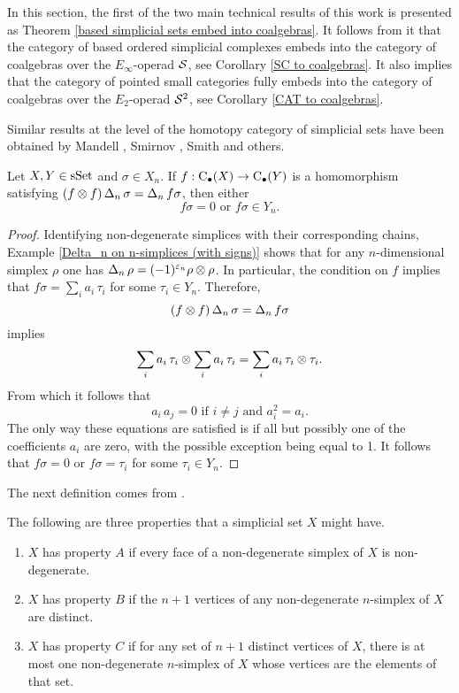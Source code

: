 \documentclass[main.tex]{subfiles}
\begin{document}
In this section, the first of the two main technical results of this work is presented as Theorem \ref{based simplicial sets embed into coalgebras}. It follows from it that the category of based ordered simplicial complexes embeds into the category of coalgebras over the $E_\infty$-operad $\S$, see Corollary \ref{SC to coalgebras}. It also implies that the category of pointed small categories fully embeds into the category of coalgebras over the $E_2$-operad $\S^2$, see Corollary \ref{CAT to coalgebras}.

Similar results at the level of the homotopy category of simplicial sets have been obtained by Mandell \cite{Man06}, Smirnov \cite{Smi98}, Smith \cite{Smi15} and others.

\begin{lemma} \label{simplices to simplices}
Let $X,Y\in\sSet$ and $\sigma\in X_n$. If $f:\chains(X)\to\chains(Y)$ is a homomorphism satisfying $(f\tensor f)\cop_n\sigma=\cop_n f\sigma$, then either $$f\sigma=0\text{\ \ or\ \ }f\sigma\in Y_n.$$
\begin{proof}
Identifying non-degenerate simplices with their corresponding chains, Example \ref{Delta_n on n-simplices (with signs)} shows that for any $n$-dimensional simplex $\rho$ one has $\cop_n\rho=(-1)^{\varepsilon_n}\rho\tensor\rho$. In particular, the condition on $f$ implies that $f\sigma=\sum_ia_i\,\tau_i$ for some $\tau_i\in Y_n$. Therefore,
$$(f\tensor f)\cop_n\sigma=\cop_n f\sigma$$ implies $$\sum_ia_i\,\tau_i\tensor \sum_ia_i\,\tau_i = \sum_ia_i\,\tau_i\tensor\tau_i. $$
From which it follows that
$$a_i\,a_j=0 \text{ if } i\neq j \text{ and } a_i^2=a_i.$$
The only way these equations are satisfied is if all but possibly one of the coefficients $a_i$ are zero, with the possible exception being equal to 1. It follows that $f\sigma=0$ or $f\sigma=\tau_i$ for some $\tau_i\in Y_n$.
\end{proof}
\end{lemma}

The next definition comes from \cite{May03}.

\begin{defn} The following are three properties that a simplicial set $X$ might have.
\begin{enumerate}[$(A)$]
\item $X$ has property $A$ if every
face of a non-degenerate simplex of $X$ is non-degenerate.
\item $X$ has property $B$ if the $n+1$ vertices
of any non-degenerate $n$-simplex of $X$ are distinct.
\item $X$ has property $C$ if for any set of
$n+1$ distinct vertices of $X$, there is at most one non-degenerate $n$-simplex of
$X$ whose vertices are the elements of that set.
\end{enumerate}
\end{defn}
\end{document}
